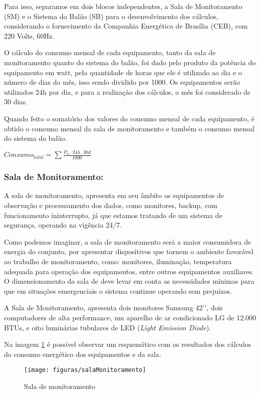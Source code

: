 Para isso, separamos em dois blocos independentes, a Sala de Monitoramento (SM) e o Sistema do Balão (SB)  para o desenvolvimento dos cálculos, considerando o fornecimento da Companhia Energética de Brasília (CEB), com 220 Volts, 60Hz.~\cite{ceb}

O cálculo do consumo mensal de cada equipamento, tanto da sala de monitoramento quanto do sistema do balão, foi dado pelo produto da potência do equipamento em watt, pela quantidade de horas que ele é utilizado ao dia e o número de dias do mês, isso sendo dividido por 1000. Os equipamentos serão utilizados 24h por dia, e para a realização dos cálculos, o mês foi considerado de 30 dias.

Quando feito o somatório dos valores do consumo mensal de cada equipamento, é obtido o consumo mensal da sala de monitoramento e também o consumo mensal do sistema do balão.

$Consumo_{total} =  \sum{\frac{P_w \cdot 24h \cdot 30d}{1000}}$

 \subsubsection{Sala de Monitoramento:}

 A sala de monitoramento, apresenta em seu âmbito os equipamentos de observação e processamento dos dados, como monitores, backup, com funcionamento ininterrupto, já que estamos tratando de um sistema de segurança, operando na vigência 24/7.

Como podemos imaginar, a sala de monitoramento será a maior consumidora de energia do conjunto, por apresentar dispositivos que tornem o ambiente favorável ao trabalho de monitoramento, como: monitores, iluminação, temperatura adequada para operação dos equipamentos, entre outros equipamentos auxiliares. O dimensionamento da sala de deve levar em conta as necessidades mínimas para que em situações emergenciais o sistema continue operando sem prejuízos.

A Sala de Monitoramento, apresenta dois monitores Samsung 42’’, dois computadores de alta performance, um aparelho de ar condicionado LG de 12.000 BTUs, e oito luminárias tubulares de LED (\textit{Light Emission Diode}).

Na imagem \ref{img:salaMonitoramento} é possivel observar um esquemático com os resultados dos cálculos do consumo energético dos equipamentos e da sala.

\begin{figure}[H]
	\centering
	\caption{Sala de monitoramento}
	\texttt{[image: figuras/salaMonitoramento]}
	\label{img:salaMonitoramento}
\end{figure}


